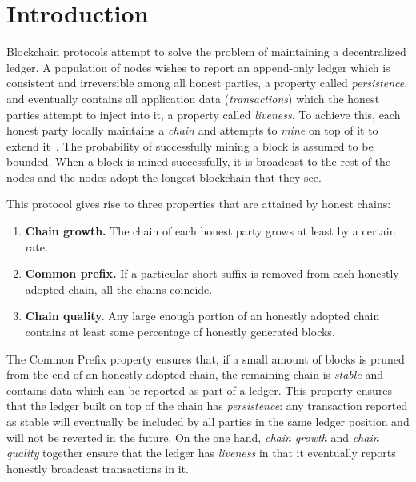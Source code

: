 \section{Introduction}

Blockchain protocols attempt to solve the problem of maintaining a decentralized
ledger. A population of nodes wishes to report an append-only ledger which
is consistent and irreversible among all honest parties, a property called
\emph{persistence}, and eventually contains all application data (\emph{transactions}) which the honest parties
attempt to inject into it, a property called \emph{liveness}. To achieve this,
each honest party locally maintains a \emph{chain} and attempts to \emph{mine}
on top of it to extend it~\cite{EC:GarKiaLeo15}. The probability of successfully
mining a block is assumed to be bounded. When a block is mined successfully, it
is broadcast to the rest of the nodes and the nodes adopt the longest blockchain
that they see.

This protocol gives rise to three properties that are attained by honest chains:
\begin{enumerate}
  \item \textbf{Chain growth.} The chain of each honest party grows at least by
        a certain rate.
  \item \textbf{Common prefix.} If a particular short suffix is removed from
        each honestly adopted chain, all the chains coincide.
  \item \textbf{Chain quality.} Any large enough portion of an honestly adopted
        chain contains at least some percentage of honestly generated blocks.
\end{enumerate}

The Common Prefix property ensures that, if a small amount of blocks is pruned
from the end of an honestly adopted chain, the remaining chain is \emph{stable}
and contains data which can be reported as part of a ledger. This property
ensures that the ledger built on top of the chain has \emph{persistence}:
any transaction reported as stable will eventually be included by all
parties in the same ledger position and will not
be reverted in the future. On the one hand, \emph{chain growth} and \emph{chain
quality} together ensure that the ledger has \emph{liveness} in that it eventually
reports honestly broadcast transactions in it.

